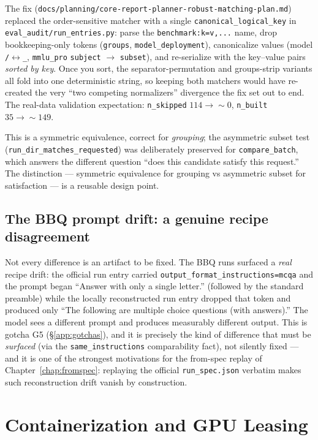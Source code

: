\documentclass[11pt]{report}
\newcommand{\code}[1]{\texttt{#1}}
\newcommand{\file}[1]{\texttt{#1}}
\begin{document}
The fix (\file{docs/planning/core-report-planner-robust-matching-plan.md}) replaced
the order-sensitive matcher with a single \code{canonical\_logical\_key} in
\file{eval\_audit/run\_entries.py}: parse the \code{benchmark:k=v,...} name, drop
bookkeeping-only tokens (\code{groups}, \code{model\_deployment}), canonicalize
values (model \code{/}$\leftrightarrow$\code{\_}, \code{mmlu\_pro} \code{subject}
$\rightarrow$ \code{subset}), and re-serialize with the key--value pairs
\emph{sorted by key}. Once you sort, the separator-permutation and groups-strip
variants all fold into one deterministic string, so keeping both matchers would
have re-created the very ``two competing normalizers'' divergence the fix set out
to end. The real-data validation expectation: \code{n\_skipped} $114\rightarrow\sim0$,
\code{n\_built} $35\rightarrow\sim149$.

This is a symmetric equivalence, correct for \emph{grouping}; the asymmetric subset
test (\code{run\_dir\_matches\_requested}) was deliberately preserved for
\code{compare\_batch}, which answers the different question ``does this candidate
satisfy this request.'' The distinction --- symmetric equivalence for grouping vs
asymmetric subset for satisfaction --- is a reusable design point.

\section{The BBQ prompt drift: a genuine recipe disagreement}

Not every difference is an artifact to be fixed. The BBQ runs surfaced a
\emph{real} recipe drift: the official run entry carried
\code{output\_format\_instructions=mcqa} and the prompt began ``Answer with only a
single letter.'' (followed by the standard preamble) while the locally
reconstructed run entry dropped that token and produced only ``The following are
multiple choice questions (with answers).'' The model sees a different prompt and
produces measurably different output. This is gotcha G5 (\S\ref{app:gotchas}), and
it is precisely the kind of difference that must be \emph{surfaced} (via the
\code{same\_instructions} comparability fact), not silently fixed --- and it is one
of the strongest motivations for the from-spec replay of
Chapter~\ref{chap:fromspec}: replaying the official \file{run\_spec.json} verbatim
makes such reconstruction drift vanish by construction.

\chapter{Containerization and GPU Leasing}
\label{chap:containers}
\end{document}
